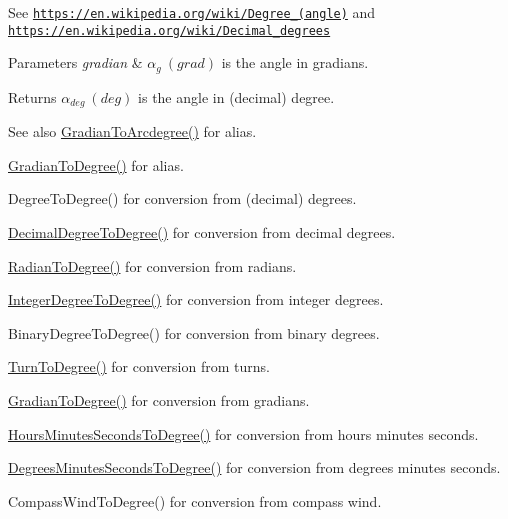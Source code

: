 See \href{https://en.wikipedia.org/wiki/Degree_(angle)}{\tt https\+://en.\+wikipedia.\+org/wiki/\+Degree\+\_\+(angle)} and \href{https://en.wikipedia.org/wiki/Decimal_degrees}{\tt https\+://en.\+wikipedia.\+org/wiki/\+Decimal\+\_\+degrees} 
\begin{DoxyParams}{Parameters}
{\em gradian} & $\alpha_{g}\ (grad)$ is the angle in gradians. \\
\hline
\end{DoxyParams}
\begin{DoxyReturn}{Returns}
$\alpha_{deg}\ (deg)$ is the angle in (decimal) degree. 
\end{DoxyReturn}
\begin{DoxySeeAlso}{See also}
\mbox{\hyperlink{group___e_g_x_math-_conversions-_angle_conversions-_gradian_gacd0b1797f2460944dcbc541a855ec21c}{Gradian\+To\+Arcdegree()}} for alias. 

\mbox{\hyperlink{group___e_g_x_math-_conversions-_angle_conversions-_gradian_gaa284952274f16d225951cf5139d0ff4e}{Gradian\+To\+Degree()}} for alias. 

Degree\+To\+Degree() for conversion from (decimal) degrees. 

\mbox{\hyperlink{group___e_g_x_math-_conversions-_angle_conversions-_decimal_degree_ga0aa7f2f5dbb00cf4ab303421c6e33ccf}{Decimal\+Degree\+To\+Degree()}} for conversion from decimal degrees. 

\mbox{\hyperlink{group___e_g_x_math-_conversions-_angle_conversions-_radian_ga25bbce6cdc1c3621f2a158d320e3bc45}{Radian\+To\+Degree()}} for conversion from radians. 

\mbox{\hyperlink{group___e_g_x_math-_conversions-_angle_conversions-_integer_degree_gaa9b63c6095fd7f8809fcfa2ba1e62235}{Integer\+Degree\+To\+Degree()}} for conversion from integer degrees. 

Binary\+Degree\+To\+Degree() for conversion from binary degrees. 

\mbox{\hyperlink{group___e_g_x_math-_conversions-_angle_conversions-_turn_ga19eceb6db54a1cf17789639c2a869cb9}{Turn\+To\+Degree()}} for conversion from turns. 

\mbox{\hyperlink{group___e_g_x_math-_conversions-_angle_conversions-_gradian_gaa284952274f16d225951cf5139d0ff4e}{Gradian\+To\+Degree()}} for conversion from gradians. 

\mbox{\hyperlink{group___e_g_x_math-_conversions-_angle_conversions-_hours_minutes_seconds_ga4f66698550a0cf0fd326f25aba2c0d80}{Hours\+Minutes\+Seconds\+To\+Degree()}} for conversion from hours minutes seconds. 

\mbox{\hyperlink{group___e_g_x_math-_conversions-_angle_conversions-_degrees_minutes_seconds_gae59bfb37c0751e60e315f8a1ed3dc0cf}{Degrees\+Minutes\+Seconds\+To\+Degree()}} for conversion from degrees minutes seconds. 

Compass\+Wind\+To\+Degree() for conversion from compass wind. 
\end{DoxySeeAlso}

